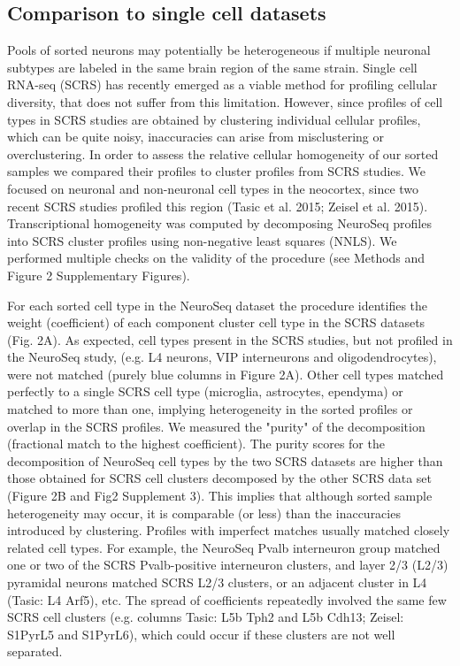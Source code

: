 \subsection{Comparison to single cell datasets}
Pools of sorted neurons may potentially be heterogeneous if multiple neuronal subtypes are labeled in the same brain region of the same strain. Single cell RNA-seq (SCRS) has recently emerged as a viable method for profiling cellular diversity, that does not suffer from this limitation. However, since profiles of cell types in SCRS studies are obtained by clustering individual cellular profiles, which can be quite noisy, inaccuracies can arise from misclustering or overclustering. In order to assess the relative cellular homogeneity of our sorted samples we compared their profiles to cluster profiles from SCRS studies. We focused on neuronal and non-neuronal cell types in the neocortex, since two recent SCRS studies profiled this region (Tasic et al. 2015; Zeisel et al. 2015). Transcriptional homogeneity was computed by decomposing NeuroSeq profiles into SCRS cluster profiles using non-negative least squares (NNLS). We performed multiple checks on the validity of the procedure (see Methods and Figure 2 Supplementary Figures). 

For each sorted cell type in the NeuroSeq dataset the procedure identifies the weight (coefficient) of each component cluster cell type in the SCRS datasets (Fig. 2A). As expected, cell types present in the SCRS studies, but not profiled in the NeuroSeq study, (e.g. L4 neurons, VIP interneurons and oligodendrocytes), were not matched (purely blue columns in Figure 2A). Other cell types matched perfectly to a single SCRS cell type (microglia, astrocytes, ependyma) or matched to more than one, implying heterogeneity in the sorted profiles or overlap in the SCRS profiles. We measured the "purity" of the decomposition (fractional match to the highest coefficient). The purity scores for the decomposition of NeuroSeq cell types by the two SCRS datasets are higher than those obtained for SCRS cell clusters decomposed by the other SCRS data set (Figure 2B and Fig2 Supplement 3). This implies that although sorted sample heterogeneity may occur, it is comparable (or less) than the inaccuracies introduced by clustering. Profiles with imperfect matches usually matched closely related cell types. For example, the NeuroSeq Pvalb interneuron group matched one or two of the SCRS Pvalb-positive interneuron clusters, and layer 2/3 (L2/3) pyramidal neurons matched SCRS L2/3 clusters, or an adjacent cluster in L4 (Tasic: L4 Arf5), etc. The spread of coefficients repeatedly involved the same few SCRS cell clusters (e.g. columns Tasic: L5b Tph2 and L5b Cdh13; Zeisel: S1PyrL5 and S1PyrL6), which could occur if these clusters are not well separated. 

